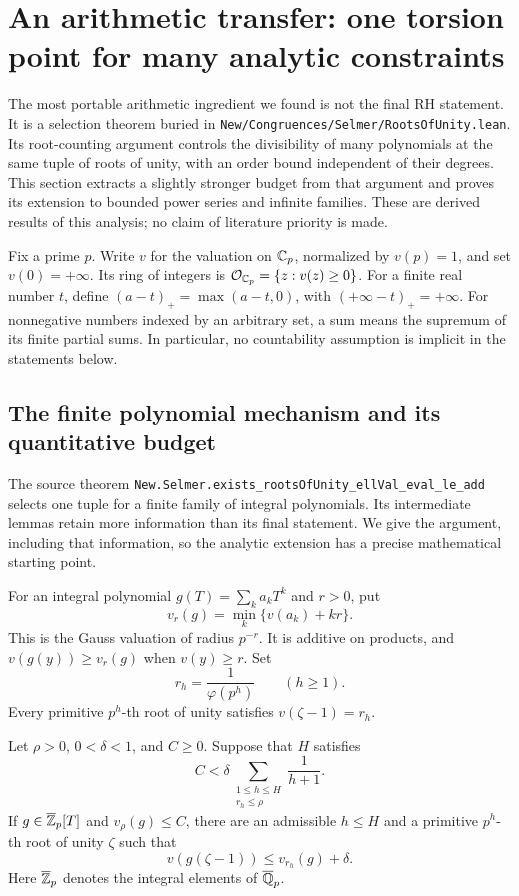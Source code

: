 \section{An arithmetic transfer: one torsion point for many analytic constraints}
\label{sec:torsion-transfer}

The most portable arithmetic ingredient we found is not the final RH
statement. It is a selection theorem buried in
\texttt{New/Congruences/Selmer/RootsOfUnity.lean}. Its root-counting argument
controls the divisibility of many polynomials at the same tuple of roots of
unity, with an order bound independent of their degrees. This section
extracts a slightly stronger budget from that argument and proves its
extension to bounded power series and infinite families. These are derived
results of this analysis; no claim of literature priority is made.

Fix a prime $p$. Write $v$ for the valuation on $\mathbb C_p$, normalized by
$v(p)=1$, and set $v(0)=+\infty$. Its ring of integers is
$\mathcal O_{\mathbb C_p}=\{z:v(z)\ge0\}$. For a finite real number $t$, define
$(a-t)_+=\max(a-t,0)$, with $(+\infty-t)_+=+\infty$.
For nonnegative numbers indexed by an arbitrary set, a sum means the
supremum of its finite partial sums. In particular, no countability
assumption is implicit in the statements below.

\subsection{The finite polynomial mechanism and its quantitative budget}

The source theorem
\texttt{New.Selmer.exists\_rootsOfUnity\_ellVal\_eval\_le\_add}
selects one tuple for a finite family of integral polynomials. Its
intermediate lemmas retain more information than its final statement.
We give the argument, including that information, so the analytic
extension has a precise mathematical starting point.

For an integral polynomial $g(T)=\sum_k a_kT^k$ and $r>0$, put
\[
 v_r(g)=\min_k\{v(a_k)+kr\}.
\]
This is the Gauss valuation of radius $p^{-r}$. It is additive on
products, and $v(g(y))\ge v_r(g)$ when $v(y)\ge r$.
Set
\[
 r_h=\frac1{\varphi(p^h)}\qquad(h\ge1).
\]
Every primitive $p^h$-th root of unity satisfies $v(\zeta-1)=r_h$.

\begin{lemma}
\label{lem:one-coordinate-torsion}
Let $\rho>0$, $0<\delta<1$, and $C\ge0$. Suppose that $H$ satisfies
\[
 C<\delta\sum_{\substack{1\le h\le H\\r_h\le\rho}}\frac1{h+1}.
\]
If $g\in\overline{\mathbb Z}_p[T]$ and $v_\rho(g)\le C$, there are an
admissible $h\le H$ and a primitive $p^h$-th root of unity $\zeta$ such
that
\[
 v(g(\zeta-1))\le v_{r_h}(g)+\delta.
\]
Here $\overline{\mathbb Z}_p$ denotes the integral elements of
$\overline{\mathbb Q}_p$.
\end{lemma}

